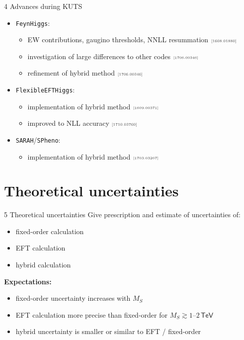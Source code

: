 \documentclass[hyperref={pdfpagelabels=false},ngerman]{beamer}
\newcommand{\eh}[1]{\,\mathsf{#1}}
\newcommand{\MS}{\ensuremath{M_S}}
\newcommand{\mycite}[1]{\ensuremath{\text{\textcolor{darkgray}{\tiny [#1]}}}}
\renewcommand{\emph}{\textbf}
\newcommand{\feft}{\texttt{FlexibleEFTHiggs}\xspace}
\newcommand{\FH}{\texttt{FeynHiggs}\xspace}
\newcommand{\SPheno}{\texttt{SPheno}\xspace}
\newcommand{\SARAH}{\texttt{SARAH}\xspace}
\begin{document}
\begin{frame}{4 Advances during KUTS}
  \begin{itemize}
  \item \FH:
    \begin{itemize}
    \item EW contributions, gaugino thresholds, NNLL resummation \mycite{1608.01880}
    \item investigation of large differences to other codes \mycite{1706.00346}
    \item refinement of hybrid method \mycite{1706.00346}
  \end{itemize}
  \item \feft:
    \begin{itemize}
    \item implementation of hybrid method \mycite{1609.00371}
    \item improved to NLL accuracy \mycite{1710.03760}
  \end{itemize}
  \item \SARAH/\SPheno:
    \begin{itemize}
    \item implementation of hybrid method \mycite{1703.03267}
    \end{itemize}
  \end{itemize}
\end{frame}

\section{Theoretical uncertainties}

\begin{frame}{5 Theoretical uncertainties}
  Give prescription and estimate of uncertainties of:
  \begin{itemize}
  \item fixed-order calculation
  \item EFT calculation
  \item hybrid calculation
  \end{itemize}
  \vspace{1em}
  \emph{Expectations:}
  \begin{itemize}
  \item fixed-order uncertainty increases with $\MS$
  \item EFT calculation more precise than fixed-order for
    $\MS \gtrsim 1$--$2\eh{TeV}$
  \item hybrid uncertainty is smaller or similar to EFT / fixed-order
  \end{itemize}
\end{frame}
\end{document}
